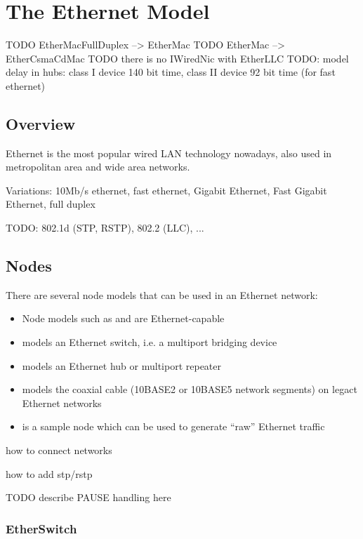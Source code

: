 \chapter{The Ethernet Model}
\label{cha:ethernet}

TODO EtherMacFullDuplex --> EtherMac
TODO EtherMac --> EtherCsmaCdMac
TODO there is no IWiredNic with EtherLLC
TODO: model delay in hubs: class I device 140 bit time, class II device 92 bit time (for fast ethernet)

\section{Overview}

Ethernet is the most popular wired LAN technology nowadays, also used in
metropolitan area and wide area networks.

Variations: 10Mb/s ethernet, fast ethernet, Gigabit Ethernet, Fast Gigabit Ethernet, full duplex

TODO: 802.1d (STP, RSTP), 802.2 (LLC), ...


\section{Nodes}

There are several node models that can be used in an Ethernet network:
 
\begin{itemize}
  \item Node models such as  and  are Ethernet-capable
  \item {} models an Ethernet switch, i.e. a multiport bridging device
  \item {} models an Ethernet hub or multiport repeater
  \item {} models the coaxial cable (10BASE2 or 10BASE5 network segments) on legact Ethernet networks 
  \item {} is a sample node which can be used to generate ``raw'' Ethernet traffic
\end{itemize}

how to connect networks

how to add stp/rstp

TODO describe PAUSE handling here

\subsection{EtherSwitch}

